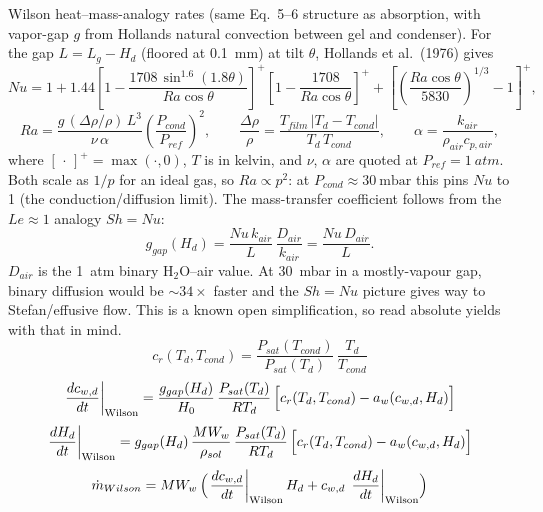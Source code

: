 \documentclass[11pt]{article}
\begin{document}
Wilson heat--mass-analogy rates (same Eq.~5--6 structure as absorption, with vapor-gap $g$ from Hollands natural convection between gel and condenser). For the gap $L = L_g - H_d$ (floored at \SI{0.1}{\milli\metre}) at tilt $\theta$, Hollands et al.\ (1976) gives
\begin{equation}
Nu = 1 + 1.44\left[1 - \frac{1708\,\sin^{1.6}(1.8\theta)}{Ra\cos\theta}\right]^{+}
\left[1 - \frac{1708}{Ra\cos\theta}\right]^{+}
+ \left[\left(\frac{Ra\cos\theta}{5830}\right)^{1/3} - 1\right]^{+},
\label{eq:hollands}
\end{equation}
\begin{equation}
Ra = \frac{g\,(\Delta\rho/\rho)\,L^3}{\nu\,\alpha}\left(\frac{P_{cond}}{P_{ref}}\right)^{2},
\qquad
\frac{\Delta\rho}{\rho} = \frac{T_{film}\,|T_d - T_{cond}|}{T_d\,T_{cond}},
\qquad
\alpha = \frac{k_{air}}{\rho_{air}c_{p,air}},
\end{equation}
where $[\,\cdot\,]^{+} = \max(\cdot, 0)$, $T$ is in kelvin, and $\nu$, $\alpha$ are quoted at $P_{ref} = \SI{1}{atm}$. Both scale as $1/p$ for an ideal gas, so $Ra \propto p^2$: at $P_{cond} \approx \SI{30}{\milli\bar}$ this pins $Nu$ to 1 (the conduction/diffusion limit). The mass-transfer coefficient follows from the $Le \approx 1$ analogy $Sh = Nu$:
\begin{equation}
g_{gap}(H_d) = \frac{Nu\,k_{air}}{L}\,\frac{D_{air}}{k_{air}} = \frac{Nu\,D_{air}}{L}.
\label{eq:ggap}
\end{equation}
$D_{air}$ is the \SI{1}{atm} binary H$_2$O--air value. At \SI{30}{\milli\bar} in a mostly-vapour gap, binary diffusion would be $\sim 34\times$ faster and the $Sh = Nu$ picture gives way to Stefan/effusive flow. This is a known open simplification, so read absolute yields with that in mind.
\begin{equation}
c_r(T_d, T_{cond}) = \frac{P_{sat}(T_{cond})}{P_{sat}(T_d)}\,\frac{T_d}{T_{cond}}
\label{eq:crdes}
\end{equation}
\begin{equation}
\left.\frac{dc_{w,d}}{dt}\right|_{\mathrm{Wilson}}
= \frac{g_{gap}(H_d)}{H_0}\,\frac{P_{sat}(T_d)}{RT_d}\,
\Bigl[c_r(T_d, T_{cond}) - a_w(c_{w,d}, H_d)\Bigr]
\label{eq:massdes_cw}
\end{equation}
\begin{equation}
\left.\frac{dH_d}{dt}\right|_{\mathrm{Wilson}}
= g_{gap}(H_d)\,\frac{MW_w}{\rho_{sol}}\,\frac{P_{sat}(T_d)}{RT_d}\,
\Bigl[c_r(T_d, T_{cond}) - a_w(c_{w,d}, H_d)\Bigr]
\label{eq:massdes_H}
\end{equation}
\begin{equation}
\dot{m}_{Wilson} = MW_w\,\Bigl(
\left.\frac{dc_{w,d}}{dt}\right|_{\mathrm{Wilson}} H_d
+ c_{w,d}\,\left.\frac{dH_d}{dt}\right|_{\mathrm{Wilson}}\Bigr)
\label{eq:mwilson}
\end{equation}
\end{document}
